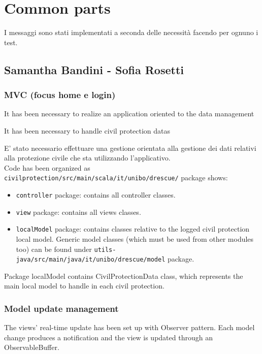 \documentclass[a4paper,12pt]{report}
\begin{document}
\section{Common parts}
I messaggi sono stati implementati a seconda delle necessità facendo per ognuno i test.

\subsection{Samantha Bandini - Sofia Rosetti}

\subsubsection{MVC (focus home e login)}

It has been necessary to realize an application oriented to the data management %

It has been necessary to handle civil protection datas 

E' stato necessario effettuare una gestione orientata alla gestione dei dati relativi alla protezione civile che sta utilizzando l'applicativo.\\

Code has been organized as \texttt{civilprotection/src/main/scala/it/unibo/drescue/} package shows: 

\begin{itemize}
\item \texttt{controller} package: contains all controller classes.
\item \texttt{view} package: contains all views classes.
\item \texttt{localModel} package: contains classes relative to the logged civil protection local model. Generic model classes (which must be used from other modules too) can be found under \texttt{utils-java/src/main/java/it/unibo/drescue/model} package.
\end{itemize} 

Package localModel contains CivilProtectionData class, which represents the main local model to handle in each civil protection.


\subsubsection{Model update management}

The views' real-time update has been set up with Observer pattern. Each model change produces a notification and the view is updated through an ObservableBuffer.
\end{document}
